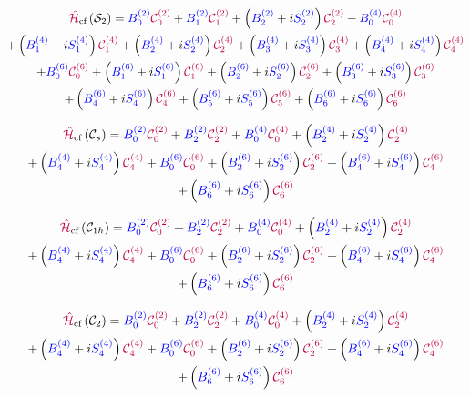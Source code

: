 \begin{multline}
\hamCrystalFieldSymbol\left(\groupSymbol{S}{2}\right)  = \Bkq{2}{0} \Ckq{2}{0} + 
 \Bkq{2}{1} \Ckq{2}{1} + 
 \left(\Bkq{2}{2} + \iu \Skq{2}{2}\right) \Ckq{2}{2} + 
 \Bkq{4}{0} \Ckq{4}{0} \\ 
 + \left(\Bkq{4}{1} + \iu \Skq{4}{1}\right) \Ckq{4}{1} + 
 \left(\Bkq{4}{2} + \iu \Skq{4}{2}\right) \Ckq{4}{2} + 
 \left(\Bkq{4}{3} + \iu \Skq{4}{3}\right) \Ckq{4}{3} + 
 \left(\Bkq{4}{4} + \iu \Skq{4}{4}\right) \Ckq{4}{4} \\ 
 + \Bkq{6}{0} \Ckq{6}{0} + 
 \left(\Bkq{6}{1} + \iu \Skq{6}{1}\right) \Ckq{6}{1} + 
 \left(\Bkq{6}{2} + \iu \Skq{6}{2}\right) \Ckq{6}{2} + 
 \left(\Bkq{6}{3} + \iu \Skq{6}{3}\right) \Ckq{6}{3} \\ 
 + \left(\Bkq{6}{4} + \iu \Skq{6}{4}\right) \Ckq{6}{4} + 
 \left(\Bkq{6}{5} + \iu \Skq{6}{5}\right) \Ckq{6}{5} + 
 \left(\Bkq{6}{6} + \iu \Skq{6}{6}\right) \Ckq{6}{6}
\label{eqn:cf:S2}
\end{multline}


\begin{multline}
\hamCrystalFieldSymbol\left(\groupSymbol{C}{s}\right)  = \Bkq{2}{0} \Ckq{2}{0} + 
 \Bkq{2}{2} \Ckq{2}{2} + 
 \Bkq{4}{0} \Ckq{4}{0} + 
 \left(\Bkq{4}{2} + \iu \Skq{4}{2}\right) \Ckq{4}{2} \\ 
 + \left(\Bkq{4}{4} + \iu \Skq{4}{4}\right) \Ckq{4}{4} + 
 \Bkq{6}{0} \Ckq{6}{0} + 
 \left(\Bkq{6}{2} + \iu \Skq{6}{2}\right) \Ckq{6}{2} + 
 \left(\Bkq{6}{4} + \iu \Skq{6}{4}\right) \Ckq{6}{4} \\ 
 + \left(\Bkq{6}{6} + \iu \Skq{6}{6}\right) \Ckq{6}{6}
\label{eqn:cf:Cs}
\end{multline}


\begin{multline}
\hamCrystalFieldSymbol\left(\groupSymbol{C}{1h}\right)  = \Bkq{2}{0} \Ckq{2}{0} + 
 \Bkq{2}{2} \Ckq{2}{2} + 
 \Bkq{4}{0} \Ckq{4}{0} + 
 \left(\Bkq{4}{2} + \iu \Skq{4}{2}\right) \Ckq{4}{2} \\ 
 + \left(\Bkq{4}{4} + \iu \Skq{4}{4}\right) \Ckq{4}{4} + 
 \Bkq{6}{0} \Ckq{6}{0} + 
 \left(\Bkq{6}{2} + \iu \Skq{6}{2}\right) \Ckq{6}{2} + 
 \left(\Bkq{6}{4} + \iu \Skq{6}{4}\right) \Ckq{6}{4} \\ 
 + \left(\Bkq{6}{6} + \iu \Skq{6}{6}\right) \Ckq{6}{6}
\label{eqn:cf:C1h}
\end{multline}


\begin{multline}
\hamCrystalFieldSymbol\left(\groupSymbol{C}{2}\right)  = \Bkq{2}{0} \Ckq{2}{0} + 
 \Bkq{2}{2} \Ckq{2}{2} + 
 \Bkq{4}{0} \Ckq{4}{0} + 
 \left(\Bkq{4}{2} + \iu \Skq{4}{2}\right) \Ckq{4}{2} \\ 
 + \left(\Bkq{4}{4} + \iu \Skq{4}{4}\right) \Ckq{4}{4} + 
 \Bkq{6}{0} \Ckq{6}{0} + 
 \left(\Bkq{6}{2} + \iu \Skq{6}{2}\right) \Ckq{6}{2} + 
 \left(\Bkq{6}{4} + \iu \Skq{6}{4}\right) \Ckq{6}{4} \\ 
 + \left(\Bkq{6}{6} + \iu \Skq{6}{6}\right) \Ckq{6}{6}
\label{eqn:cf:C2}
\end{multline}


